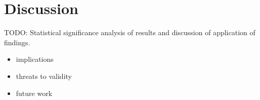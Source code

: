 \section{Discussion} %
TODO: Statistical significance analysis of results and discussion of application of findings.
\begin{itemize}
    \item implications
    \item threats to validity
    \item future work
\end{itemize}